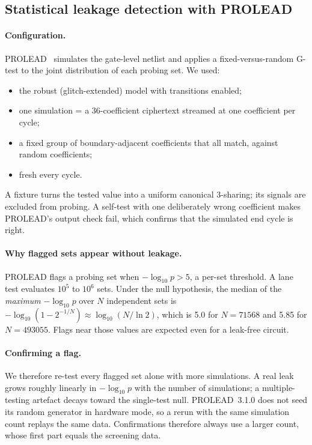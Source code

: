 \subsection{Statistical leakage detection with PROLEAD}\label{sec:prolead}
\paragraph{Configuration.} PROLEAD~\cite{mueller2022prolead} simulates the gate-level netlist and applies a fixed-versus-random G-test to the joint distribution of each probing set. We used:
\begin{itemize}
  \item the robust (glitch-extended) model with transitions enabled;
  \item one simulation = a 36-coefficient ciphertext streamed at one coefficient per cycle;
  \item a fixed group of boundary-adjacent coefficients that all match, against random coefficients;
  \item fresh  every cycle.
\end{itemize}
A fixture turns the tested value into a uniform canonical 3-sharing; its signals are excluded from probing. A self-test with one deliberately wrong coefficient makes PROLEAD's output check fail, which confirms that the simulated end cycle is right.

\paragraph{Why flagged sets appear without leakage.} PROLEAD flags a probing set when $-\log_{10} p > 5$, a per-set threshold. A lane test evaluates $10^5$ to $10^6$ sets. Under the null hypothesis, the median of the \emph{maximum} $-\log_{10} p$ over $N$ independent sets is $-\log_{10}(1 - 2^{-1/N}) \approx \log_{10}(N/\ln 2)$, which is 5.0 for $N = \num{71568}$ and 5.85 for $N = \num{493055}$. Flags near those values are expected even for a leak-free circuit.

\paragraph{Confirming a flag.} We therefore re-test every flagged set alone with more simulations. A real leak grows roughly linearly in $-\log_{10} p$ with the number of simulations; a multiple-testing artefact decays toward the single-test null. PROLEAD~3.1.0 does not seed its random generator in hardware mode, so a rerun with the same simulation count replays the same data. Confirmations therefore always use a larger count, whose first part equals the screening data.

